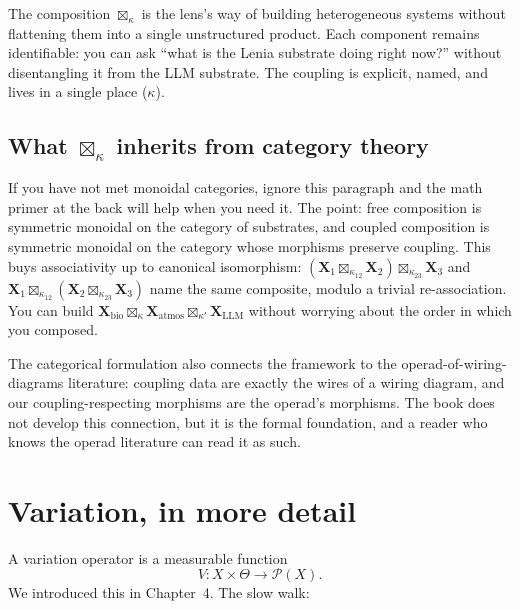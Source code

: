 The composition $\boxtimes_\kappa$ is the lens's way of building
heterogeneous systems without flattening them into a single
unstructured product. Each component remains identifiable: you can ask
``what is the Lenia substrate doing right now?'' without disentangling
it from the LLM substrate. The coupling is explicit, named, and lives
in a single place ($\kappa$).

\subsection*{What $\boxtimes_\kappa$ inherits from category theory}

If you have not met monoidal categories, ignore this paragraph and the
math primer at the back will help when you need it. The point: free
composition is symmetric monoidal on the category of substrates, and
coupled composition is symmetric monoidal on the category whose
morphisms preserve coupling. This buys associativity up to canonical
isomorphism: $(\mathbf{X}_1 \boxtimes_{\kappa_{12}} \mathbf{X}_2)
\boxtimes_{\kappa_{23}} \mathbf{X}_3$ and $\mathbf{X}_1
\boxtimes_{\kappa_{12}} (\mathbf{X}_2 \boxtimes_{\kappa_{23}}
\mathbf{X}_3)$ name the same composite, modulo a trivial
re-association. You can build $\mathbf{X}_{\mathrm{bio}}
\boxtimes_\kappa \mathbf{X}_{\mathrm{atmos}} \boxtimes_{\kappa'}
\mathbf{X}_{\mathrm{LLM}}$ without worrying about the order in which
you composed.

The categorical formulation also connects the framework to the
operad-of-wiring-diagrams literature: coupling data are exactly the
wires of a wiring diagram, and our coupling-respecting morphisms are
the operad's morphisms. The book does not develop this connection, but
it is the formal foundation, and a reader who knows the operad
literature can read it as such.

\section{Variation, in more detail}

A variation operator is a measurable function
\[
  V : X \times \Theta \to \mathcal{P}(X).
\]
We introduced this in Chapter~4. The slow walk:

